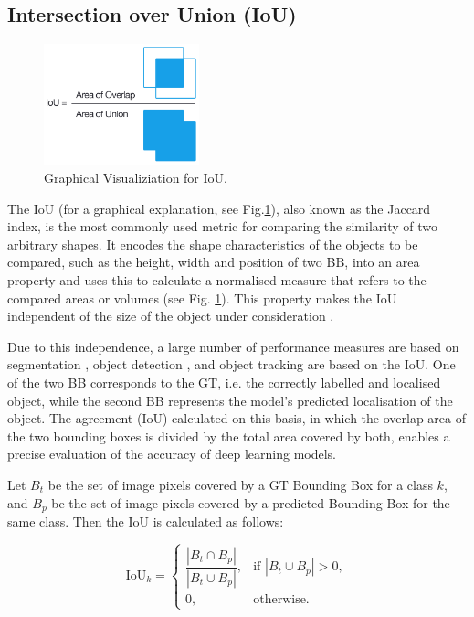 \subsection{Intersection over Union (IoU)}

\begin{figure}[h]
    \centering
    \includegraphics[width=0.4\textwidth]{images/011Fundamentals/IoU.png}
    \caption{Graphical Visualiziation for IoU. \cite{iou_pic}}
    \label{fig:IoU}
\end{figure}

The \acrfull{IoU} (for a graphical explanation, see Fig.\ref{fig:IoU}), also known as the Jaccard index, is the most commonly used metric for comparing the similarity of two arbitrary shapes. It encodes the shape characteristics of the objects to be compared, such as the height, width and position of two \acrfull{BB}, into an area property and uses this to calculate a normalised measure that refers to the compared areas or volumes (see Fig. \ref{fig:IoU}). This property makes the \acrshort{IoU} independent of the size of the object under consideration \cite{Rezatofighi2019}.

Due to this independence, a large number of performance measures are based on segmentation \cite{Ramirez2019,cordts2016,Zhou2017,lin2015}, object detection \cite{lin2015,Everingham2010}, and object tracking \cite{Kristan2016,lealtaixé2015} are based on the \acrshort{IoU}. One of the two \acrshort{BB} corresponds to the \acrfull{GT}, i.e. the correctly labelled and localised object, while the second \acrshort{BB} represents the model's predicted localisation of the object. The agreement (\acrshort{IoU}) calculated on this basis, in which the overlap area of the two bounding boxes is divided by the total area covered by both, enables a precise evaluation of the accuracy of deep learning models.
\begin{definition}
    Let $B_t$ be the set of image pixels covered by a \acrlong{GT} Bounding Box for a class $k$, 
    and $B_p$ be the set of image pixels covered by a predicted Bounding Box for the same class. 
    Then the IoU is calculated as follows:

    \begin{equation}
    \text{IoU}_k =
    \begin{cases}
        \dfrac{|B_t \cap B_p|}{|B_t \cup B_p|}, & \text{if } |B_t \cup B_p| > 0, \\[6pt]
        0, & \text{otherwise.}
    \end{cases}
    \end{equation}

\end{definition}








